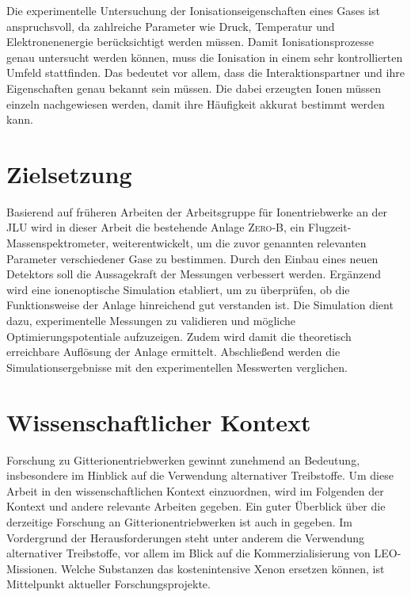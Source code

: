 Die experimentelle Untersuchung der Ionisationseigenschaften eines Gases ist anspruchsvoll, da zahlreiche Parameter wie Druck, Temperatur und Elektronenenergie berücksichtigt werden müssen. Damit Ionisationsprozesse genau untersucht werden können, muss die Ionisation in einem sehr kontrollierten Umfeld stattfinden. Das bedeutet vor allem, dass die Interaktionspartner und ihre Eigenschaften genau bekannt sein müssen. Die dabei erzeugten Ionen müssen einzeln nachgewiesen werden, damit ihre Häufigkeit akkurat bestimmt werden kann. 

\section{Zielsetzung}
Basierend auf früheren Arbeiten der Arbeitsgruppe für Ionentriebwerke an der JLU wird in dieser Arbeit die bestehende Anlage \textsc{Zero-B}, ein Flugzeit-Massenspektrometer, weiterentwickelt, um die zuvor genannten relevanten Parameter verschiedener Gase zu bestimmen. Durch den Einbau eines neuen Detektors soll die Aussagekraft der Messungen verbessert werden. Ergänzend wird eine ionenoptische Simulation etabliert, um zu überprüfen, ob die Funktionsweise der Anlage hinreichend gut verstanden ist. Die Simulation dient dazu, experimentelle Messungen zu validieren und mögliche Optimierungspotentiale aufzuzeigen. Zudem wird damit die theoretisch erreichbare Auflösung der Anlage ermittelt. Abschließend werden die Simulationsergebnisse mit den experimentellen Messwerten verglichen.

\section{Wissenschaftlicher Kontext}
Forschung zu Gitterionentriebwerken gewinnt zunehmend an Bedeutung, insbesondere im Hinblick auf die Verwendung alternativer Treibstoffe. Um diese Arbeit in den wissenschaftlichen Kontext einzuordnen, wird im Folgenden der Kontext und andere relevante Arbeiten gegeben. Ein guter Überblick über die derzeitige Forschung an Gitterionentriebwerken ist auch in \cite{ion} gegeben. Im Vordergrund der Herausforderungen steht unter anderem die Verwendung alternativer Treibstoffe, vor allem im Blick auf die Kommerzialisierung von LEO-Missionen. Welche Substanzen das kostenintensive Xenon ersetzen können, ist Mittelpunkt aktueller Forschungsprojekte.
 
